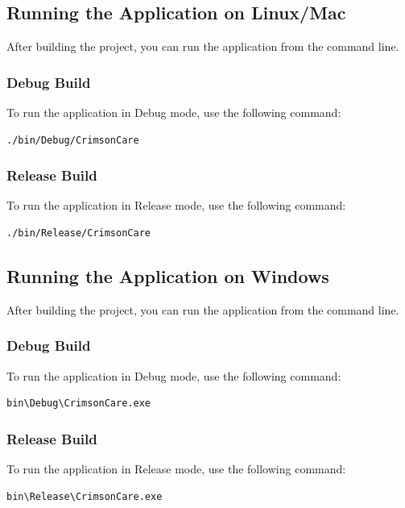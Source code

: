 \documentclass[12pt,a4paper]{report}
\begin{document}
\subsection{Running the Application on Linux/Mac}
After building the project, you can run the application from the command line.

\subsubsection{Debug Build}
To run the application in Debug mode, use the following command:
\begin{lstlisting}[language=Bash, caption=Running Debug Build on Linux/Mac]
./bin/Debug/CrimsonCare
\end{lstlisting}

\subsubsection{Release Build}
To run the application in Release mode, use the following command:
\begin{lstlisting}[language=Bash, caption=Running Release Build on Linux/Mac]
./bin/Release/CrimsonCare
\end{lstlisting}

\subsection{Running the Application on Windows}
After building the project, you can run the application from the command line.

\subsubsection{Debug Build}
To run the application in Debug mode, use the following command:
\begin{lstlisting}[language=Bash, caption=Running Debug Build on Windows]
bin\Debug\CrimsonCare.exe
\end{lstlisting}

\subsubsection{Release Build}
To run the application in Release mode, use the following command:
\begin{lstlisting}[language=Bash, caption=Running Release Build on Windows]
bin\Release\CrimsonCare.exe
\end{lstlisting}
\end{document}
